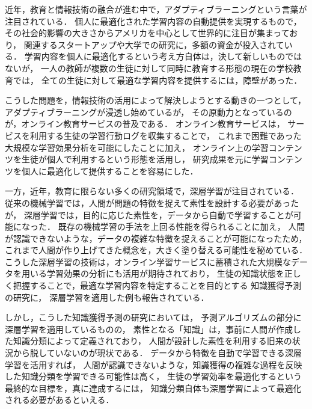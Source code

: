 近年，教育と情報技術の融合が進む中で，アダプティブラーニングという言葉が注目されている．
個人に最適化された学習内容の自動提供を実現するもので，その社会的影響の大きさからアメリカを中心として世界的に注目が集まっており，
関連するスタートアップや大学での研究に，多額の資金が投入されている．
学習内容を個人に最適化するという考え方自体は，決して新しいものではないが，
一人の教師が複数の生徒に対して同時に教育する形態の現在の学校教育では，
全ての生徒に対して最適な学習内容を提供するには，障壁があった．


こうした問題を，情報技術の活用によって解決しようとする動きの一つとして，アダプティブラーニングが浸透し始めているが，
その原動力となっているのが，オンライン教育サービスの普及である．
オンライン教育サービスは，
サービスを利用する生徒の学習行動ログを収集することで，
これまで困難であった大規模な学習効果分析を可能にしたことに加え，
オンライン上の学習コンテンツを生徒が個人で利用するという形態を活用し，
研究成果を元に学習コンテンツを個人に最適化して提供することを容易にした．


一方，近年，教育に限らない多くの研究領域で，深層学習が注目されている．
従来の機械学習では，人間が問題の特徴を捉えて素性を設計する必要があったが，
深層学習では，目的に応じた素性を，データから自動で学習することが可能になった．
既存の機械学習の手法を上回る性能を得られることに加え，
人間が認識できないような，データの複雑な特徴を捉えることが可能になったため，
これまで人間が作り上げてきた概念を，大きく塗り替える可能性を秘めている．
こうした深層学習の技術は，オンライン学習サービスに蓄積された大規模なデータを用いる学習効果の分析にも活用が期待されており，
生徒の知識状態を正しく把握することで，最適な学習内容を特定することを目的とする
知識獲得予測の研究に，
深層学習を適用した例も報告されている．

しかし，こうした知識獲得予測の研究においては，
予測アルゴリズムの部分に深層学習を適用しているものの，
素性となる「知識」は，事前に人間が作成した知識分類によって定義されており，
人間が設計した素性を利用する旧来の状況から脱していないのが現状である．
データから特徴を自動で学習できる深層学習を活用すれば，
人間が認識できないような，知識獲得の複雑な過程を反映した知識分類を学習できる可能性は高く，
生徒の学習効率を最適化するという最終的な目標を，真に達成するには，
知識分類自体も深層学習によって最適化される必要があるといえる．



